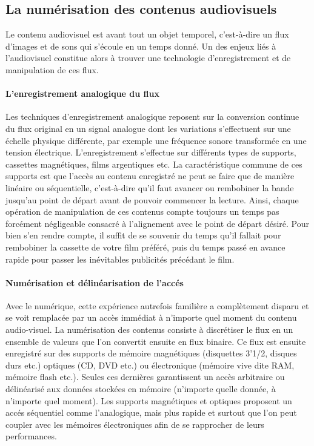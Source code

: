 \subsection{La numérisation des contenus audiovisuels}\label{sec:num}
Le contenu audiovisuel est avant tout un objet temporel, c'est-à-dire un flux d'images et de sons qui s'écoule en un temps donné. 
Un des enjeux liés à l'audiovisuel constitue alors à trouver une technologie d'enregistrement et de manipulation de ces flux.

\paragraph{L'enregistrement analogique du flux}
Les techniques d'enregistrement analogique reposent sur la conversion continue du flux original en un signal analogue dont les variations s'effectuent sur une échelle physique différente, par exemple une fréquence sonore transformée en une tension électrique. 
L'enregistrement s'effectue sur différents types de supports, cassettes magnétiques, films argentiques etc. 
La caractéristique commune de ces supports est que l'accès au contenu enregistré ne peut se faire que de manière linéaire ou séquentielle, c'est-à-dire qu'il faut avancer ou rembobiner la bande jusqu'au point de départ avant de pouvoir commencer la lecture. 
Ainsi, chaque opération de manipulation de ces contenus compte toujours un temps pas forcément négligeable consacré à l'alignement avec le point de départ désiré. 
Pour bien s'en rendre compte, il suffit de se souvenir du temps qu'il fallait pour rembobiner la cassette de votre film préféré, puis du temps passé en avance rapide pour passer les inévitables publicités précédant le film.

\paragraph{Numérisation et délinéarisation de l'accés}
Avec le numérique, cette expérience autrefois familière a complètement disparu et se voit remplacée par un accès immédiat à n'importe quel moment du contenu audio-visuel. 
La numérisation des contenus consiste à discrétiser le flux en un ensemble de valeurs que l'on convertit ensuite en flux binaire. Ce flux est ensuite enregistré sur des supports de mémoire magnétiques (disquettes 3'1/2, disques durs etc.) optiques (CD, DVD etc.) ou électronique (mémoire vive dite RAM, mémoire flash etc.). 
Seules ces dernières garantissent un accès arbitraire ou délinéarisé aux données stockées en mémoire (n'importe quelle donnée, à n'importe quel moment). 
Les supports magnétiques et optiques proposent un accés séquentiel comme l'analogique, mais plus rapide et surtout que l'on peut coupler avec les mémoires électroniques afin de se rapprocher de leurs performances.

